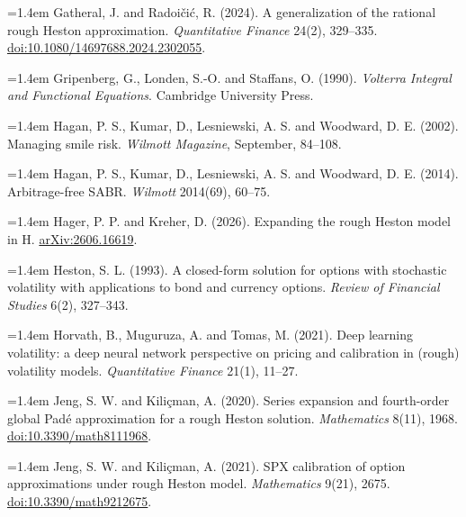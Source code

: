 \documentclass[11pt,a4paper]{article}
\begin{document}
\hangindent=1.4em Gatheral, J. and Radoičić, R. (2024). A generalization of the rational rough Heston approximation. \emph{Quantitative Finance} 24(2), 329–335. \href{https://doi.org/10.1080/14697688.2024.2302055}{doi:10.1080/14697688.2024.2302055}.\par

\hangindent=1.4em Gripenberg, G., Londen, S.-O. and Staffans, O. (1990). \emph{Volterra Integral and Functional Equations}. Cambridge University Press.\par

\hangindent=1.4em Hagan, P. S., Kumar, D., Lesniewski, A. S. and Woodward, D. E. (2002). Managing smile risk. \emph{Wilmott Magazine}, September, 84–108.\par

\hangindent=1.4em Hagan, P. S., Kumar, D., Lesniewski, A. S. and Woodward, D. E. (2014). Arbitrage-free SABR. \emph{Wilmott} 2014(69), 60–75.\par

\hangindent=1.4em Hager, P. P. and Kreher, D. (2026). Expanding the rough Heston model in H. \href{https://arxiv.org/abs/2606.16619v1}{arXiv:2606.16619}.\par

\hangindent=1.4em Heston, S. L. (1993). A closed-form solution for options with stochastic volatility with applications to bond and currency options. \emph{Review of Financial Studies} 6(2), 327–343.\par

\hangindent=1.4em Horvath, B., Muguruza, A. and Tomas, M. (2021). Deep learning volatility: a deep neural network perspective on pricing and calibration in (rough) volatility models. \emph{Quantitative Finance} 21(1), 11–27.\par

\hangindent=1.4em Jeng, S. W. and Kiliçman, A. (2020). Series expansion and fourth-order global Padé approximation for a rough Heston solution. \emph{Mathematics} 8(11), 1968. \href{https://doi.org/10.3390/math8111968}{doi:10.3390/math8111968}.\par

\hangindent=1.4em Jeng, S. W. and Kiliçman, A. (2021). SPX calibration of option approximations under rough Heston model. \emph{Mathematics} 9(21), 2675. \href{https://doi.org/10.3390/math9212675}{doi:10.3390/math9212675}.\par
\end{document}
